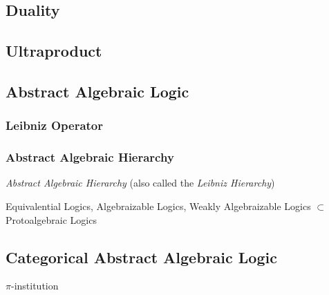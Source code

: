 \subsection{Duality}\label{sec:duality}

\subsection{Ultraproduct}\label{sec:ultraproducts}

\subsection{Abstract Algebraic Logic}
\label{sec:abstract_algebraic_logic}

\subsubsection{Leibniz Operator}\label{sec:leibniz_operator}



\subsubsection{Abstract Algebraic Hierarchy}\label{sec:leibniz_hierarchy}

\emph{Abstract Algebraic Hierarchy} (also called the \emph{Leibniz
  Hierarchy})

Equivalential Logics, Algebraizable Logics, Weakly Algebraizable
Logics $\subset$ Protoalgebraic Logics



\subsection{Categorical Abstract Algebraic Logic}
\label{sec:categorical_abstract}

$\pi$-institution
